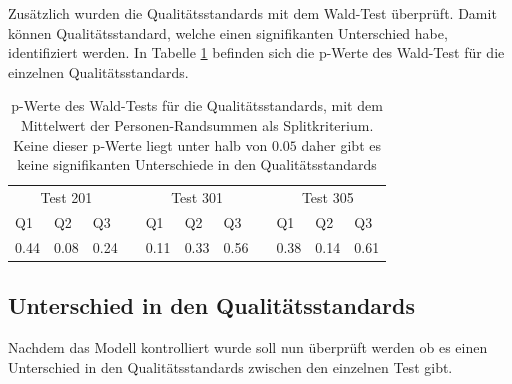 Zusätzlich wurden die Qualitätsstandards mit dem Wald-Test überprüft. Damit können Qualitätsstandard, welche einen signifikanten Unterschied habe, identifiziert werden. In Tabelle \ref{tab:WaldTest} befinden sich die p-Werte des Wald-Test für die einzelnen Qualitätsstandards.

\begin{table}[htbp]
  \centering
\begin{tabular}{@{}lllllllllll@{}}
\toprule
 \multicolumn{3}{c}{Test 201} &&  \multicolumn{3}{c}{Test 301}&&  \multicolumn{3}{c}{Test 305}\\ 
    \cmidrule{1-3}\cmidrule{5-7}\cmidrule{9-11}
 Q1 & Q2 & Q3 && Q1 & Q2 & Q3 && Q1 & Q2 & Q3  \\ 
\midrule
  0.44 & 0.08 & 0.24 && 0.11 & 0.33 & 0.56 && 0.38 & 0.14 & 0.61   \\ 

\bottomrule
\end{tabular} 
  \caption{p-Werte des Wald-Tests für die Qualitätsstandards, mit dem Mittelwert der Personen-Randsummen als Splitkriterium. Keine dieser p-Werte liegt unter halb von $0.05$ daher gibt es keine signifikanten Unterschiede in den Qualitätsstandards }
  \label{tab:WaldTest}
\end{table}


\subsection{Unterschied in den Qualitätsstandards}

Nachdem das Modell kontrolliert wurde soll nun überprüft werden ob es einen Unterschied in den Qualitätsstandards zwischen den einzelnen Test gibt.


